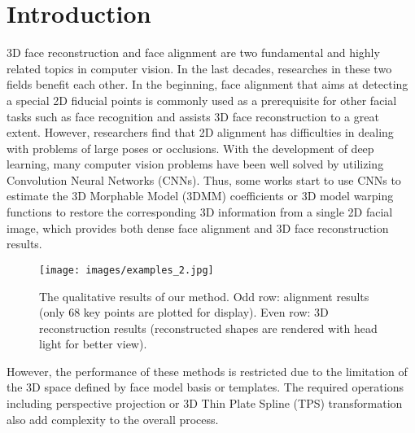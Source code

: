 \documentclass[runningheads]{llncs}
\begin{document}
\section{Introduction}

3D face reconstruction and face alignment are two fundamental and highly related topics in computer vision. 
In the last decades, researches in these two fields benefit each other.
In the beginning, face alignment that aims at detecting a special 2D fiducial points \cite{zhou2013extensive,zhang2014facial,liang2015unconstrained,peng2016recurrent}
is commonly used as a prerequisite for other facial tasks such as face recognition \cite{wagner2012toward} and assists 3D face reconstruction \cite{zhu2015high-fidelity,Huber2016A} to a great extent.
However, researchers find that 2D alignment has difficulties \cite{zhao2016fast,jeni2016first} in dealing with problems of large poses or occlusions.
With the development of deep learning, many computer vision problems have been well solved by utilizing Convolution Neural Networks (CNNs). 
Thus, some works start to use CNNs to estimate the 3D Morphable Model (3DMM) coefficients \cite{Jourabloo2016Large,zhu2016face,Richardson20163D,liu2016joint,Richardson2016Learning,liu2017dense} or 3D model warping functions  \cite{bhagavatula2017faster,Sela2017Unrestricted} to restore the corresponding 3D information from a single 2D facial image, which provides both dense face alignment and 3D face reconstruction results.
\begin{figure} 
\vspace{-3mm}
\centering
\texttt{[image: images/examples\_2.jpg]} 
\caption{The qualitative results of our method. Odd row: alignment results (only 68 key points are plotted for display). Even row: 3D reconstruction results (reconstructed shapes are rendered with head light for better view).}
\label{fig:examples} \vspace{-5mm}
\end{figure}
However, the performance of these methods is restricted due to the limitation of the 3D space defined by face model basis or templates. The required operations including perspective projection or 3D Thin Plate Spline (TPS) transformation also add complexity to the overall process.
\end{document}
